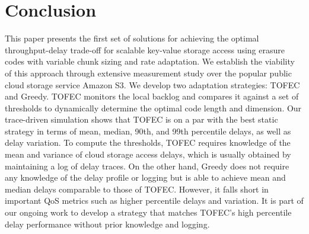 \documentclass[journal]{IEEEtran}
\newcommand{\ourproposal}{TOFEC\xspace}
\begin{document}
\section{Conclusion}
\label{sec:conclusion}
This paper presents the first set of solutions for achieving the optimal throughput-delay trade-off for scalable key-value storage access using erasure codes with variable chunk sizing and rate adaptation. We establish the viability of this approach through extensive measurement study over the popular public cloud storage service Amazon S3. We develop two adaptation strategies: \ourproposal and Greedy.  \ourproposal monitors the local backlog and compares it against a set of thresholds to dynamically determine the optimal code length and dimension. Our trace-driven simulation shows that \ourproposal is on a par with the best static strategy in terms of mean, median, 90th, and 99th percentile delays, as well as delay variation. To compute the thresholds, \ourproposal requires knowledge of the mean and variance of cloud storage access delays, which is usually obtained by maintaining a log of delay traces. On the other hand, Greedy does not require any knowledge of the delay profile or logging but is able to achieve mean and median delays comparable to those of \ourproposal. However, it falls short in important QoS metrics such as higher percentile delays and variation. It is part of our ongoing work to develop a strategy that matches \ourproposal's high percentile delay performance without prior knowledge and logging.
\end{document}
